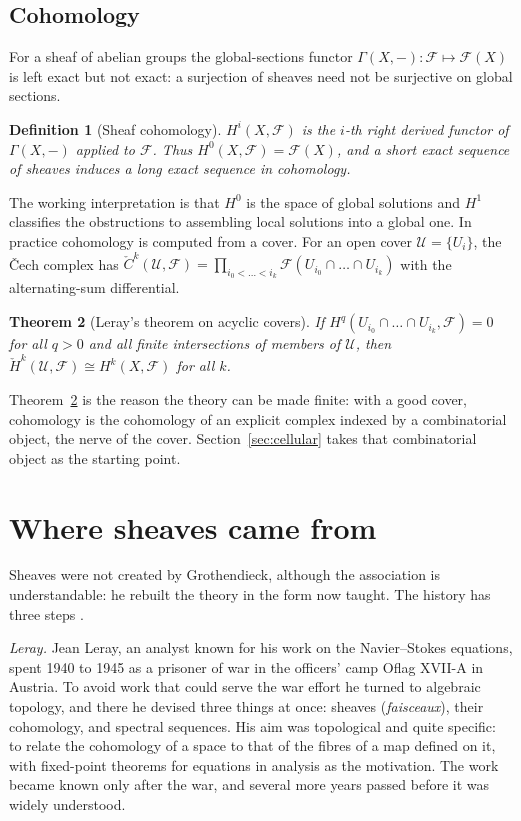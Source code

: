 \documentclass[11pt,a4paper,oneside]{scrartcl}
\theoremstyle{guideplain}
\newtheorem{theorem}{Theorem}[section]
\theoremstyle{guidedef}
\newtheorem{definition}[theorem]{Definition}
\newcommand{\F}{\mathcal{F}}
\newcommand{\U}{\mathcal{U}}
\begin{document}
\subsection{Cohomology}

For a sheaf of abelian groups the global-sections functor $\Gamma(X,-)\colon\F\mapsto\F(X)$ is left
exact but not exact: a surjection of sheaves need not be surjective on global sections.

\begin{definition}[Sheaf cohomology]
  $H^i(X,\F)$ is the $i$-th right derived functor of $\Gamma(X,-)$ applied to $\F$. Thus
  $H^0(X,\F)=\F(X)$, and a short exact sequence of sheaves induces a long exact sequence in
  cohomology.
\end{definition}

The working interpretation is that $H^0$ is the space of global solutions and $H^1$ classifies the
obstructions to assembling local solutions into a global one. In practice cohomology is computed
from a cover. For an open cover $\U=\{U_i\}$, the Čech complex has
$\check C^k(\U,\F)=\prod_{i_0<\dots<i_k}\F(U_{i_0}\cap\dots\cap U_{i_k})$ with the alternating-sum
differential.

\begin{theorem}[Leray's theorem on acyclic covers]\label{thm:leray}
  If $H^q(U_{i_0}\cap\dots\cap U_{i_k},\F)=0$ for all $q>0$ and all finite intersections of members
  of $\U$, then $\check H^k(\U,\F)\cong H^k(X,\F)$ for all $k$.
\end{theorem}

Theorem~\ref{thm:leray} is the reason the theory can be made finite: with a good cover, cohomology is
the cohomology of an explicit complex indexed by a combinatorial object, the nerve of the cover.
Section~\ref{sec:cellular} takes that combinatorial object as the starting point.

\section{Where sheaves came from}\label{sec:history}

Sheaves were not created by Grothendieck, although the association is understandable: he rebuilt the
theory in the form now taught. The history has three steps
\autocite{miller2000,gray1979,houzel1990}.

\emph{Leray.} Jean Leray, an analyst known for his work on the Navier--Stokes equations, spent 1940
to 1945 as a prisoner of war in the officers' camp Oflag XVII-A in Austria. To avoid work that could
serve the war effort he turned to algebraic topology, and there he devised three things at once:
sheaves (\emph{faisceaux}), their cohomology, and spectral sequences. His aim was topological and
quite specific: to relate the cohomology of a space to that of the fibres of a map defined on it,
with fixed-point theorems for equations in analysis as the motivation. The work became known only
after the war, and several more years passed before it was widely understood.
\end{document}
